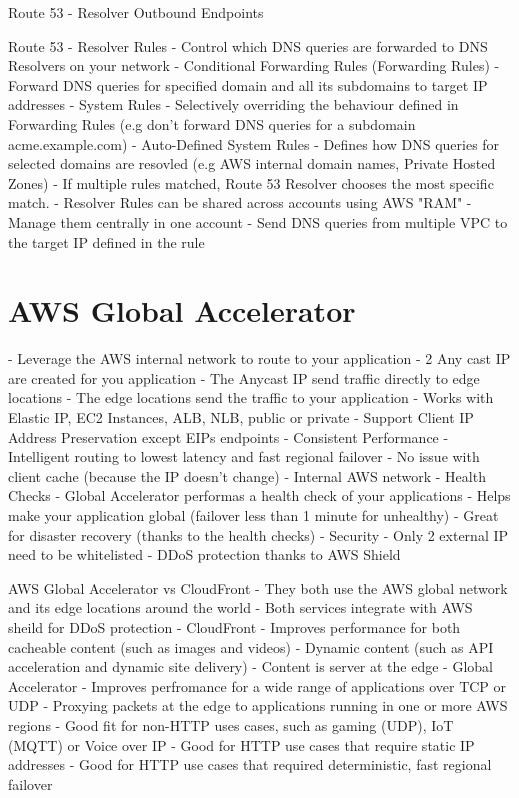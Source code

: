 Route 53 - Resolver Outbound Endpoints

Route 53 - Resolver Rules
- Control which DNS queries are forwarded to DNS Resolvers on your network
- Conditional Forwarding Rules (Forwarding Rules)
- Forward DNS queries for specified domain and all its subdomains to target IP addresses
- System Rules
- Selectively overriding the behaviour defined in Forwarding Rules (e.g don't forward DNS queries for a subdomain acme.example.com)
- Auto-Defined System Rules
- Defines how DNS queries for selected domains are resovled (e.g AWS internal domain names, Private Hosted Zones)
- If multiple rules matched, Route 53 Resolver chooses the most specific match.
- Resolver Rules can be shared across accounts using AWS "RAM"
- Manage them centrally in one account
- Send DNS queries from multiple VPC to the target IP defined in the rule


\section{AWS Global Accelerator}
- Leverage the AWS internal network to route to your application
- 2 Any cast IP are created for you application
- The Anycast IP send traffic directly to edge locations
- The edge locations send the traffic to your application
- Works with Elastic IP, EC2 Instances, ALB, NLB, public or private
- Support Client IP Address Preservation except EIPs endpoints
- Consistent Performance
- Intelligent routing to lowest latency and fast regional failover
- No issue with client cache (because the IP doesn't change)
- Internal AWS network
- Health Checks
- Global Accelerator performas a health check of your applications
- Helps make your application global (failover less than 1 minute for unhealthy)
- Great for disaster recovery (thanks to the health checks)
- Security
- Only 2 external IP need to be whitelisted
- DDoS protection thanks to AWS Shield

AWS Global Accelerator vs CloudFront
- They both use the AWS global network and its edge locations around the world
- Both services integrate with AWS sheild for DDoS protection
- CloudFront
- Improves performance for both cacheable content (such as images and videos)
- Dynamic content (such as API acceleration and dynamic site delivery)
- Content is server at the edge
- Global Accelerator
- Improves perfromance for a wide range of applications over TCP or UDP
- Proxying packets at the edge to applications running in one or more AWS regions
- Good fit for non-HTTP uses cases, such as gaming (UDP), IoT (MQTT) or Voice over IP
- Good for HTTP use cases that require static IP addresses
- Good for HTTP use cases that required deterministic, fast regional failover


